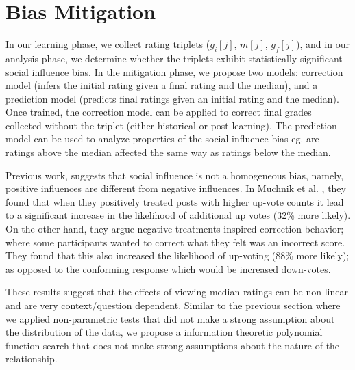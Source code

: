 \section{Bias Mitigation}
\label{changemod}
In our learning phase, we collect rating triplets ($g_i[j]$, $m[j]$, $g_f[j]$), and in our analysis phase, we determine whether the triplets exhibit statistically significant social influence bias. 
In the mitigation phase, we propose two models: correction model (infers the initial rating given a final rating and the median), and a prediction model (predicts final ratings given an initial rating and the median).
Once trained, the correction model can be applied to correct final grades collected without the triplet (either historical or post-learning).
The prediction model can be used to analyze properties of the social influence bias eg. are ratings above the median affected the same way as ratings below the median.

Previous work, suggests that social influence is not a homogeneous bias, namely, positive influences are different from negative influences.
In Muchnik et al. \cite{muchnik2013social}, they found that when they positively treated posts with higher up-vote counts it lead to a significant increase in the likelihood of additional up votes (32\% more likely). 
On the other hand, they argue negative treatments inspired correction behavior; where some participants wanted to correct what they felt was an incorrect score. 
They found that this also increased the likelihood of up-voting (88\% more likely); as opposed to the conforming response which would be increased down-votes.

These results suggest that the effects of viewing median ratings can be non-linear and are very context/question dependent.
Similar to the previous section where we applied non-parametric tests that did not make a strong assumption about the distribution of the data, we propose a information theoretic polynomial function search that does not make strong assumptions about the nature of the relationship.

